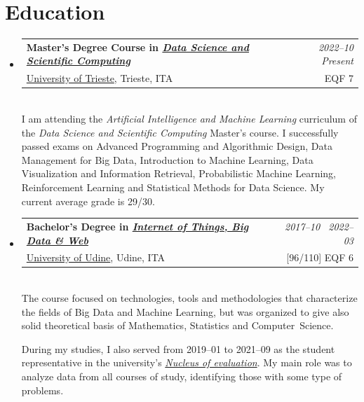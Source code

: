 \documentclass[a4paper,10pt,english]{article} %
\makeatletter
\newcommand{\resumeSubheading}[4]{
  \vspace{2pt}\item
    \begin{tabular*}{0.97\textwidth}{l@{\extracolsep{\fill}}r}
      \textbf{#1} & \textit{\small #2} \\
      #3 & \small #4 \\
    \end{tabular*}\vspace{5pt}\\
}
\makeatother
\begin{document}
\section{Education}

\begin{itemize}[leftmargin=*]

	\resumeSubheading
	{Master's Degree Course in \href{https://dssc.units.it/}{\textit{Data Science and Scientific Computing}}}{2022--10 \textrightarrow~Present}
	{\href{https://www.units.it/en/}{University of Trieste}, Trieste, ITA}{EQF 7}
	I am attending the \textit{Artificial Intelligence and Machine Learning} curriculum of the \textit{Data Science and Scientific Computing} Master's course. I successfully passed exams on Advanced Programming and Algorithmic Design, Data Management for Big Data, Introduction to Machine Learning, Data Visualization and Information Retrieval, Probabilistic Machine Learning, Reinforcement Learning and Statistical Methods for Data Science. My current average grade is 29/30.

	\resumeSubheading
	{Bachelor's Degree in \href{https://www.uniud.it/en/education/offer/courses/scientific-area/mathematics-computer-sciences-multimedia-physics/bachelor-degree-courses-undergraduate-180-ects/internet-of-things-big-data-machine-learning?set_language=en}{\textit{Internet of Things, Big Data \& Web}}}{2017--10 \textrightarrow~2022--03}
	{\href{https://www.uniud.it/en/uniud-international?set_language=en/}{University of Udine}, Udine, ITA}{[96/110] EQF 6}
	The course focused on technologies, tools and methodologies that characterize the fields of Big Data and Machine Learning,
	but was organized to give also solid theoretical basis of Mathematics, Statistics and Computer~Science.


	During my studies, I also served from 2019--01 to 2021--09 as the student representative %
	in the university's \href{https://nuva.uniud.it/funzioni/il-personale/001-digitale-nucleo-di-valutazione-modifica.pdf}{\textit{Nucleus of evaluation}}. %
	My main role was to analyze data from all courses of study, identifying those with some type of problems.


\end{itemize}
\end{document}
